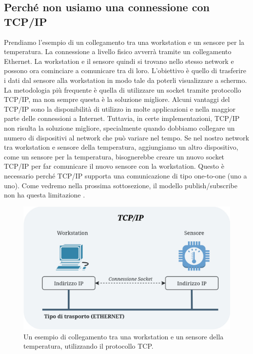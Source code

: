\subsection{Perché non usiamo una connessione con TCP/IP}
Prendiamo l'esempio di un collegamento tra una workstation e 
un sensore per la temperatura. La connessione a livello fisico
avverrà tramite un collegamento Ethernet. La workstation e il 
sensore quindi si trovano nello stesso network e possono 
ora cominciare a comunicare tra di loro. L'obiettivo è quello
di trasferire i dati dal sensore alla workstation in modo tale
da poterli visualizzare a schermo.
La metodologia più frequente è quella di utilizzare un socket tramite 
protocollo TCP/IP, ma non sempre questa è la soluzione migliore.
Alcuni vantaggi del TCP/IP sono la disponibilità di utilizzo 
in molte applicazioni e nella maggior parte 
delle connessioni a Internet.
Tuttavia, in certe implementazioni, TCP/IP non risulta la soluzione migliore,
specialmente quando dobbiamo collegare un numero di dispositivi al 
network che può variare nel tempo. Se nel nostro network tra workstation e 
sensore della temperatura, aggiungiamo un altro dispositivo, come un 
sensore per la temperatura, bisognerebbe creare un nuovo socket 
TCP/IP per far comunicare il nuovo sensore con la workstation.
Questo è necessario perché TCP/IP supporta una comunicazione di tipo 
one-to-one (uno a uno). Come vedremo nella prossima sottosezione,
il modello publish/subscribe non ha questa limitazione \cite{1494965}.



\begin{figure}[H]
    \centering
    \includegraphics[width=12cm, keepaspectratio]{img/TCP connessione-Pagina-2.jpg}
    \caption{Un esempio di collegamento tra una workstation e un sensore della temperatura,
    utilizzando il protocollo TCP.}
    \label{TCP connection}
\end{figure}



